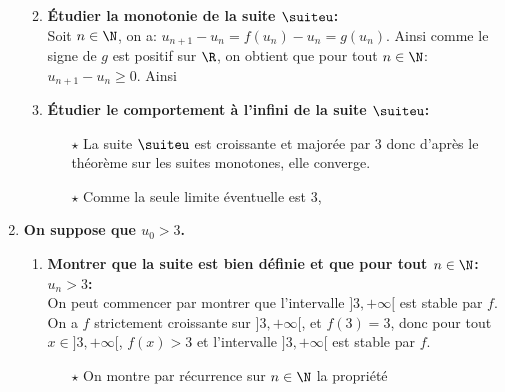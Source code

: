 \begin{correction}
\begin{enumerate}
\begin{enumerate}
\begin{itemize}
\end{itemize}
\item \textbf{\'Etudier la monotonie de la suite $\suiteu$:}\\
\noindent Soit $n\in\N$, on a: $u_{n+1}-u_n=f(u_n)-u_n=g(u_n)$. Ainsi comme le signe de $g$ est positif sur $\R$, on obtient que pour tout $n\in\N$: $u_{n+1}-u_n\geq 0$. Ainsi 
\item \textbf{\'Etudier le comportement \`{a} l'infini de la suite $\suiteu$:}
\begin{itemize}
\item[$\star$] La suite $\suiteu$ est croissante et major\'ee par 3 donc d'apr\`{e}s le th\'eor\`{e}me sur les suites monotones, elle converge.
\item[$\star$] Comme la seule limite \'eventuelle est 3, 
\end{itemize}
\end{enumerate}
\item \textbf{On suppose que $u_0>3$.}
\begin{enumerate}
\item \textbf{Montrer que la suite est bien d\'efinie et que pour tout $n\in\N$: $u_n>3$:}\\
\noindent On peut commencer par montrer que l'intervalle $\rbrack 3,+\infty\lbrack$ est stable par $f$. On a $f$ strictement croissante sur $\rbrack 3,+\infty\lbrack$, et $f(3) = 3$, donc pour tout $x \in \rbrack 3,+\infty\lbrack$, $f(x) >3$ et l'intervalle $\rbrack 3,+\infty\lbrack$ est stable par $f$.
\begin{itemize}
\item[$\star$] On montre par r\'ecurrence sur $n\in\N$ la propri\'et\'e

\end{itemize}
\end{enumerate}
\end{enumerate}
\end{correction}
